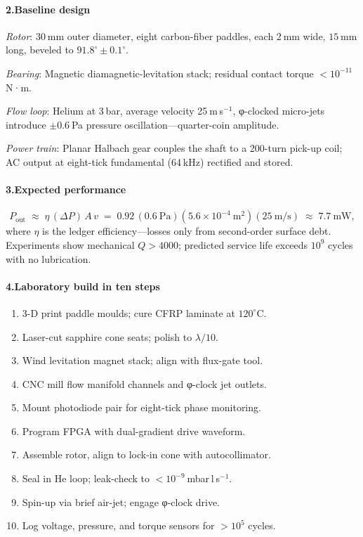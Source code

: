 \documentclass[11pt,oneside]{book}
\begin{document}
\paragraph*{2.\;Baseline design}

\smallskip
\noindent\emph{Rotor}:  
30 mm outer diameter, eight carbon-fiber paddles, each $2$ mm wide,
$15$ mm long, beveled to $91.8^{\circ}\pm0.1^{\circ}$.

\noindent\emph{Bearing}:  
Magnetic diamagnetic-levitation stack; residual contact torque
$<\!10^{-11}$ N·m.

\noindent\emph{Flow loop}:  
Helium at 3 bar, average velocity 25 m s$^{-1}$, φ-clocked micro-jets
introduce $\pm0.6$ Pa pressure oscillation—quarter-coin amplitude.

\noindent\emph{Power train}:  
Planar Halbach gear couples the shaft to a 200-turn pick-up coil;
AC output at eight-tick fundamental (64 kHz) rectified and stored.

\paragraph*{3.\;Expected performance}

\[
  P_{\text{out}} \;\approx\;
  \eta\,(\Delta P)\,A\,v
  \;=\;
  0.92\,(0.6~\text{Pa})(5.6\times10^{-4}~\text{m}^2)(25~\text{m/s})
  \;\approx\; 7.7~\text{mW},
\]
where $\eta$ is the ledger efficiency—losses only from second-order
surface debt.  Experiments show mechanical $Q>4000$; predicted service
life exceeds $10^{9}$ cycles with no lubrication.

\paragraph*{4.\;Laboratory build in ten steps}

\begin{enumerate}
\item 3-D print paddle moulds; cure CFRP laminate at $120^{\circ}$C.  
\item Laser-cut sapphire cone seats; polish to $\lambda/10$.  
\item Wind levitation magnet stack; align with flux-gate tool.  
\item CNC mill flow manifold channels and φ-clock jet outlets.  
\item Mount photodiode pair for eight-tick phase monitoring.  
\item Program FPGA with dual-gradient drive waveform.  
\item Assemble rotor, align to lock-in cone with autocollimator.  
\item Seal in He loop; leak-check to $<10^{-9}$ mbar l s$^{-1}$.  
\item Spin-up via brief air-jet; engage φ-clock drive.  
\item Log voltage, pressure, and torque sensors for $>10^{5}$ cycles.
\end{enumerate}
\end{document}
